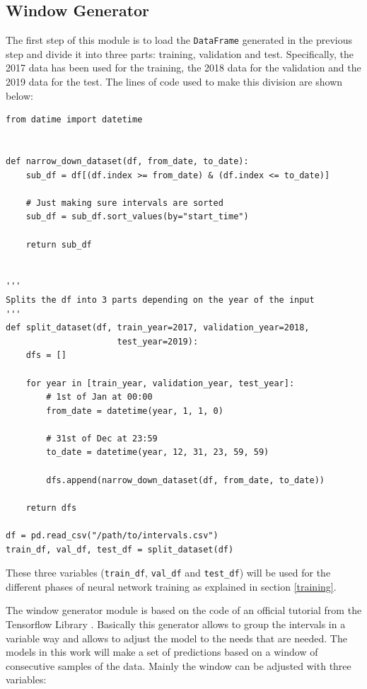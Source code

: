 \subsection{Window Generator}\label{window-generator}

The first step of this module is to load the \small{\verb|DataFrame|} \normalsize generated in the previous step and divide it into three parts: training, validation and test. Specifically, the 2017 data has been used for the training, the 2018 data for the validation and the 2019 data for the test. The lines of code used to make this division are shown below:

\begin{verbatim}
from datime import datetime


def narrow_down_dataset(df, from_date, to_date):
    sub_df = df[(df.index >= from_date) & (df.index <= to_date)]
    
    # Just making sure intervals are sorted
    sub_df = sub_df.sort_values(by="start_time") 
    
    return sub_df


'''
Splits the df into 3 parts depending on the year of the input
'''
def split_dataset(df, train_year=2017, validation_year=2018,
                      test_year=2019):
    dfs = []
    
    for year in [train_year, validation_year, test_year]:
        # 1st of Jan at 00:00
        from_date = datetime(year, 1, 1, 0)           
        
        # 31st of Dec at 23:59
        to_date = datetime(year, 12, 31, 23, 59, 59)
        
        dfs.append(narrow_down_dataset(df, from_date, to_date))

    return dfs
    
df = pd.read_csv("/path/to/intervals.csv")
train_df, val_df, test_df = split_dataset(df)
\end{verbatim}

These three variables (\small{\verb|train_df|}\normalsize, \small{\verb|val_df|} \normalsize and \small{\verb|test_df|}\normalsize) will be used for the different phases of neural network training as explained in section \ref{training}.
\newline

The window generator module is based on the code of an official tutorial from the Tensorflow Library \cite{windowgenerator}. Basically this generator allows to group the intervals in a variable way and allows to adjust the model to the needs that are needed. The models in this work will make a set of predictions based on a window of consecutive samples of the data. Mainly the window can be adjusted with three variables:

